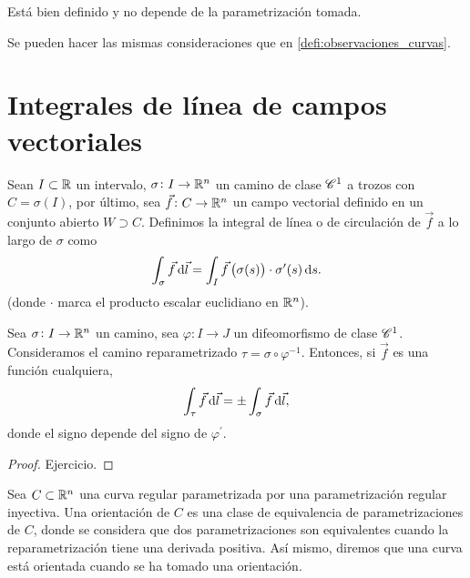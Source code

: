 \begin{obs}
    Está bien definido y no depende de la parametrización tomada.
\end{obs}
\begin{obs}
    Se pueden hacer las mismas consideraciones que en \ref{defi:observaciones_curvas}.
\end{obs}

\section{Integrales de línea de campos vectoriales}

\begin{defi}
    Sean $I \subset \mathbb{R}$ un intervalo, $\sigma \colon I \to \mathbb{R}^n$ un camino de clase $\mathscr{C}^1$ a trozos con $C = \sigma(I)$, por último,
    sea $\vec{f} \colon C \to \mathbb{R}^n$ un campo vectorial definido en un conjunto abierto $W \supset C$. Definimos la integral de línea o de circulación
    de $\vec{f}$ a lo largo de $\sigma$ como
    \[
        \int_\sigma \vec{f} \dif \vec{l} = \int_I \vec{f} \left( \sigma(s) \right) \cdot \sigma^\prime(s) \dif s.
    \]
    (donde $\cdot$ marca el producto escalar euclidiano en $\mathbb{R}^n$).
\end{defi}

\begin{prop}
    Sea $\sigma  \colon I \to \mathbb{R}^n$ un camino, sea $\varphi \colon I \to J$ un difeomorfismo de clase $\mathscr{C}^1$. Consideramos
    el camino reparametrizado $\tau = \sigma \circ \varphi^{-1}$. Entonces, si $\vec{f}$ es una función cualquiera,
    \[
        \int_\tau \vec{f} \dif \vec{l} = \pm \int_\sigma \vec{f} \dif \vec{l},
    \]
    donde el signo depende del signo de $\varphi^\prime$.
\end{prop}

\begin{proof}
    Ejercicio.
\end{proof}

\begin{defi}
    Sea $C \subset \mathbb{R}^n$ una curva regular parametrizada por una parametrización regular inyectiva. Una orientación de $C$ es una clase
    de equivalencia de parametrizaciones de $C$, donde se considera que dos parametrizaciones son equivalentes cuando la reparametrización
    tiene una derivada positiva. Así mismo, diremos que una curva está orientada cuando se ha tomado una orientación.
\end{defi}

